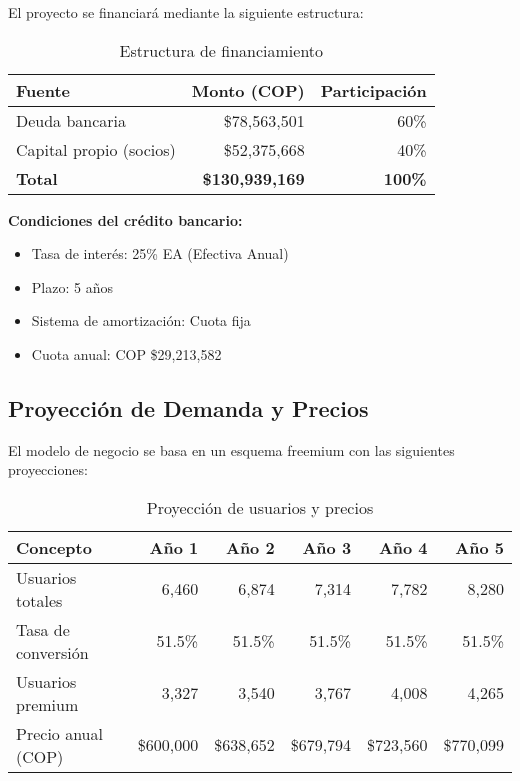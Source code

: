 El proyecto se financiará mediante la siguiente estructura:

\begin{table}[H]
\centering
\begin{tabular}{lrr}
\toprule
\textbf{Fuente} & \textbf{Monto (COP)} & \textbf{Participación} \\
\midrule
Deuda bancaria & \$78,563,501 & 60\% \\
Capital propio (socios) & \$52,375,668 & 40\% \\
\midrule
\textbf{Total} & \textbf{\$130,939,169} & \textbf{100\%} \\
\bottomrule
\end{tabular}
\caption{Estructura de financiamiento}
\end{table}

\noindent\textbf{Condiciones del crédito bancario:}
\begin{itemize}
    \item Tasa de interés: 25\% EA (Efectiva Anual)
    \item Plazo: 5 años
    \item Sistema de amortización: Cuota fija
    \item Cuota anual: COP \$29,213,582
\end{itemize}

\subsection{Proyección de Demanda y Precios}

El modelo de negocio se basa en un esquema freemium con las siguientes proyecciones:

\begin{table}[H]
\centering
\begin{tabular}{lrrrrr}
\toprule
\textbf{Concepto} & \textbf{Año 1} & \textbf{Año 2} & \textbf{Año 3} & \textbf{Año 4} & \textbf{Año 5} \\
\midrule
Usuarios totales & 6,460 & 6,874 & 7,314 & 7,782 & 8,280 \\
Tasa de conversión & 51.5\% & 51.5\% & 51.5\% & 51.5\% & 51.5\% \\
Usuarios premium & 3,327 & 3,540 & 3,767 & 4,008 & 4,265 \\
Precio anual (COP) & \$600,000 & \$638,652 & \$679,794 & \$723,560 & \$770,099 \\
\bottomrule
\end{tabular}
\caption{Proyección de usuarios y precios}
\end{table}


